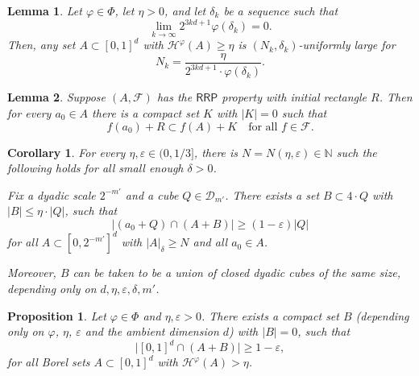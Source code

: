 \documentclass[10pt,a4paper]{amsart}
\newtheorem{lemma}{Lemma}
\newtheorem{corollary}{Corollary}
\newtheorem{proposition}{Proposition}
\def\N{{\mathbb{N}}}
\newcommand{\RRP}{\mathsf{RRP}}
\newcommand{\cD}{\mathcal{D}}
\newcommand{\e}{\varepsilon}
\renewcommand{\phi}{\varphi}
\begin{document}
\begin{lemma} \label{lem:Hausdorff-unif-large}
    Let $\phi\in\Phi$, let $\eta>0$, and let $\delta_k$ be a sequence such that
    \[
        \lim_{k\to\infty} 2^{3kd+1} \phi(\delta_k) = 0.
    \]
    Then, any set $A\subset [0,1]^d$ with $\mathcal{H}^\phi(A)\ge \eta$ is $(N_k,\delta_k)$-uniformly large for
    \[
      N_k= \frac{\eta}{2^{3kd+1} \cdot \phi(\delta_k)}.
    \]
\end{lemma}

\begin{lemma} \label{lem:nonemptyinterior}
    Suppose $(A,\mathcal{F})$ has the $\RRP$ property with initial rectangle $R$. Then for every $a_0\in A$ there is a compact set $K$ with $|K|=0$ such that
    \begin{equation} \label{eq:nonemptyinterior}
        f(a_0)+R\subset f(A)+K \quad\text{for all } f\in\mathcal{F}.
    \end{equation}
\end{lemma}

\begin{corollary} \label{cor:large-sum-R^d}
    For every $\eta,\e\in (0,1/3]$, there is $N=N(\eta,\e)\in\N$ such the following holds for all small enough $\delta>0$.

    Fix a dyadic scale $2^{-m'}$ and a cube $Q\in\cD_{m'}$. There exists a set $B\subset 4\cdot Q$ with $|B|\le \eta\cdot |Q|$, such that
    \[
        \bigl|(a_0+Q)\cap (A+B)\bigr| \ge (1-\e)|Q|
    \]
    for all  $A\subset [0,2^{-m'}]^d$ with  $|A|_{\delta}\ge N$ and all $a_0\in A$.


    Moreover, $B$ can be taken to be a union of closed dyadic cubes of the same size, depending only on $d,\eta,\e,\delta,m'$.
\end{corollary}

\begin{proposition}
    Let $\phi\in\Phi$ and $\eta,\e>0$. There exists a compact set $B$ (depending only on $\phi$, $\eta$, $\e$ and the ambient dimension $d$) with $|B|=0$, such that
    \[
        \bigl|[0,1]^d\cap (A+B)\bigr| \ge 1-\e,
    \]
    for all Borel sets $A\subset [0,1]^d$ with $\mathcal{H}^{\phi}(A)>\eta$.
\end{proposition}
\end{document}
